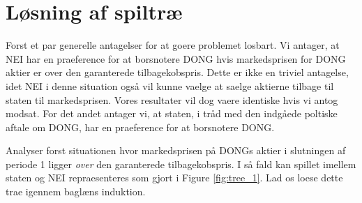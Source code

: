 \documentclass{article}
\begin{document}
\newpage

\appendix

\FloatBarrier

\section{Løsning af spiltræ}
\label{sec:app_tree}
Forst et par generelle antagelser for at goere problemet losbart. Vi antager, at NEI har en praeference for at borsnotere DONG hvis markedsprisen for DONG aktier er over den garanterede tilbagekobspris. Dette er ikke en triviel antagelse, idet NEI i denne situation også vil kunne vaelge at saelge aktierne tilbage til staten til markedsprisen. Vores resultater vil dog vaere identiske hvis vi antog modsat. For det andet antager vi, at staten, i tråd med den indgåede poltiske aftale om DONG, har en praeference for at borsnotere DONG. %

Analyser forst situationen hvor markedsprisen på DONGs aktier i slutningen af periode 1 ligger \textit{over} den garanterede tilbagekobspris. I så fald kan spillet imellem staten og NEI repraesenteres som gjort i Figure \ref{fig:tree_1}. Lad os loese dette trae igennem baglæns induktion.  
\end{document}
